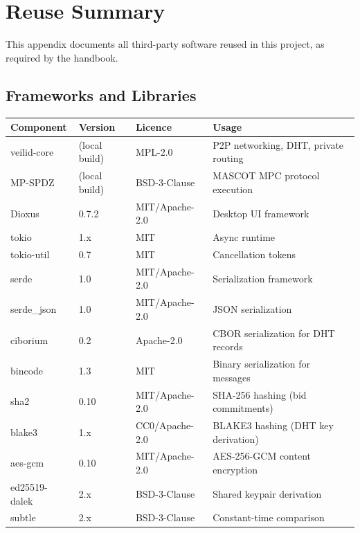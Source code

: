 \section{Reuse Summary}
\label{app:reuse}

This appendix documents all third-party software reused in this project, as required by the handbook.

\subsection*{Frameworks and Libraries}

\begin{table}[H]
\centering
\begin{tabular}{llll}
\toprule
\textbf{Component} & \textbf{Version} & \textbf{Licence} & \textbf{Usage} \\
\midrule
veilid-core     & (local build)  & MPL-2.0        & P2P networking, DHT, private routing \\
MP-SPDZ         & (local build)  & BSD-3-Clause   & MASCOT MPC protocol execution \\
Dioxus          & 0.7.2          & MIT/Apache-2.0 & Desktop UI framework \\
tokio           & 1.x            & MIT            & Async runtime \\
tokio-util      & 0.7            & MIT            & Cancellation tokens \\
serde           & 1.0            & MIT/Apache-2.0 & Serialization framework \\
serde\_json     & 1.0            & MIT/Apache-2.0 & JSON serialization \\
ciborium        & 0.2            & Apache-2.0     & CBOR serialization for DHT records \\
bincode         & 1.3            & MIT            & Binary serialization for messages \\
sha2            & 0.10           & MIT/Apache-2.0 & SHA-256 hashing (bid commitments) \\
blake3          & 1.x            & CC0/Apache-2.0 & BLAKE3 hashing (DHT key derivation) \\
aes-gcm         & 0.10           & MIT/Apache-2.0 & AES-256-GCM content encryption \\
ed25519-dalek   & 2.x            & BSD-3-Clause   & Shared keypair derivation \\
subtle          & 2.x            & BSD-3-Clause   & Constant-time comparison \\

\end{tabular}
\end{table}
